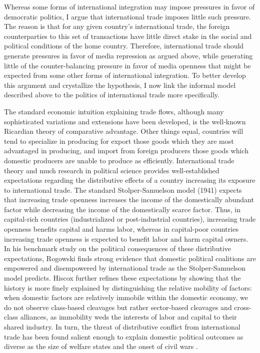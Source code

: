 \documentclass[12pt,a4paper]{article}\usepackage[]{graphicx}\usepackage[]{color}
\begin{document}
Whereas some forms of international integration may impose pressures in favor of democratic politics, I argue that international trade imposes little such pressure. The reason is that for any given country's international trade, the foreign counterparties to this set of transactions have little direct stake in the social and political conditions of the home country. Therefore, international trade should generate pressures in favor of media repression as argued above, while generating little of the counter-balancing pressure in favor of media openness that might be expected from some other forms of international integration. To better develop this argument and crystallize the hypothesis, I now link the informal model described above to the politics of international trade more specifically.

The standard economic intuition explaining trade flows, although many sophisticated variations and extensions have been developed, is the well-known Ricardian theory of comparative advantage. Other things equal, countries will tend to specialize in producing for export those goods which they are most advantaged in producing, and import from foreign producers those goods which domestic producers are unable to produce as efficiently. International trade theory and much research in political science provides well-established expectations regarding the distributive effects of a country increasing its exposure to international trade. The standard Stolper-Samuelson model (1941) expects that increasing trade openness increases the income of the domestically abundant factor while decreasing the income of the domestically scarce factor. Thus, in capital-rich countries (industrialized or post-industrial countries), increasing trade openness benefits capital and harms labor, whereas in capital-poor countries increasing trade openness is expected to benefit labor and harm capital owners. In his benchmark study on the political consequences of these distributive expectations, Rogowski \parencite*{Rogowski:1989wm} finds strong evidence that domestic political coalitions are empowered and disempowered by international trade as the Stolper-Samuelson model predicts. Hiscox \parencite*{Hiscox:2002us} further refines these expectations by showing that the history is more finely explained by distinguishing the relative mobility of factors: when domestic factors are relatively immobile within the domestic economy, we do not observe class-based cleavages but rather sector-based cleavages and cross-class alliances, as immobility weds the interests of labor and capital to their shared industry. In turn, the threat of distributive conflict from international trade has been found salient enough to explain domestic political outcomes as diverse as the size of welfare states \parencites{Cameron:1978vb}{Burgoon:2001dp} and the onset of civil wars \parencite{Bussmann:2007vx}.
\end{document}
